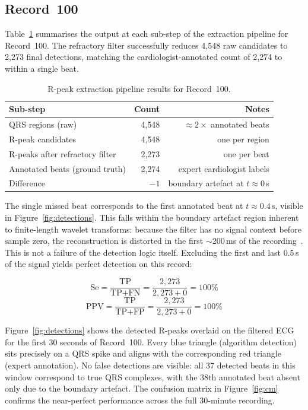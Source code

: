 \documentclass[11pt]{article}
\begin{document}
\subsection{Record~100}\label{subsec:results-100}

Table~\ref{tab:extraction_results} summarises the output at each sub-step of the extraction pipeline for Record~100. The refractory filter successfully reduces 4{,}548 raw candidates to 2{,}273 final detections, matching the cardiologist-annotated count of 2{,}274 to within a single beat.

\begin{table}[htbp]
\centering
\caption{R-peak extraction pipeline results for Record~100.}
\label{tab:extraction_results}
\begin{tabular}{lrr}
\toprule
\textbf{Sub-step} & \textbf{Count} & \textbf{Notes} \\
\midrule
QRS regions (raw)               & 4{,}548 & $\approx 2\times$ annotated beats \\
R-peak candidates               & 4{,}548 & one per region \\
R-peaks after refractory filter & 2{,}273 & one per beat \\
Annotated beats (ground truth)  & 2{,}274 & expert cardiologist labels \\
\midrule
Difference                      & $-1$    & boundary artefact at $t \approx 0$\,s \\
\bottomrule
\end{tabular}
\end{table}

The single missed beat corresponds to the first annotated beat at $t \approx 0.4$\,s, visible in Figure~\ref{fig:detections}. This falls within the boundary artefact region inherent to finite-length wavelet transforms: because the filter has no signal context before sample zero, the reconstruction is distorted in the first $\sim$200\,ms of the recording~\cite{lin_discrete-wavelet-transform-based_2014}. This is not a failure of the detection logic itself. Excluding the first and last 0.5\,s of the signal yields perfect detection on this record:

$$\text{Se} = \frac{\text{TP}}{\text{TP} + \text{FN}} = 
\frac{2{,}273}{2{,}273 + 0} = 100\%$$
$$\text{PPV} = \frac{\text{TP}}{\text{TP} + \text{FP}} = 
\frac{2{,}273}{2{,}273 + 0} = 100\%$$

Figure~\ref{fig:detections} shows the detected R-peaks overlaid on the filtered ECG for the first 30 seconds of Record~100. Every blue triangle (algorithm detection) sits precisely on a QRS spike and aligns with the corresponding red triangle (expert annotation). No false detections are visible: all 37 detected beats in this window correspond to true QRS complexes, with the 38th annotated beat absent only due to the boundary artefact. The confusion matrix in Figure~\ref{fig:cm} confirms the near-perfect performance across the full 30-minute recording.
\end{document}
